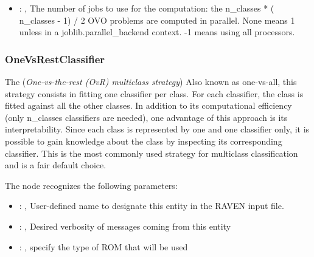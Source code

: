 \begin{itemize}
    \item {}: , 
      The number of jobs to use for the computation: the n\_classes * ( n\_classes - 1) / 2 OVO
      problems are computed in parallel. None means 1 unless in a joblib.parallel\_backend
      context. -1 means using all processors.
  \end{itemize}


\subsubsection{OneVsRestClassifier}
  The  (\textit{One-vs-the-rest (OvR) multiclass strategy})
  Also known as one-vs-all, this strategy consists in fitting one classifier per class. For each
  classifier, the class is fitted against all the other classes. In addition to its computational
  efficiency (only n\_classes classifiers are needed), one advantage of this approach is its
  interpretability. Since each class is represented by one and one classifier only, it is
  possible to gain knowledge about the class by inspecting its corresponding classifier.
  This is the most commonly used strategy for multiclass classification and is a fair default
  choice.                         

  The  node recognizes the following parameters:
    \begin{itemize}
      \item {}: , 
        User-defined name to designate this entity in the RAVEN input file.
      \item {}: , 
        Desired verbosity of messages coming from this entity
      \item {}: , 
        specify the type of ROM that will be used
  \end{itemize}

